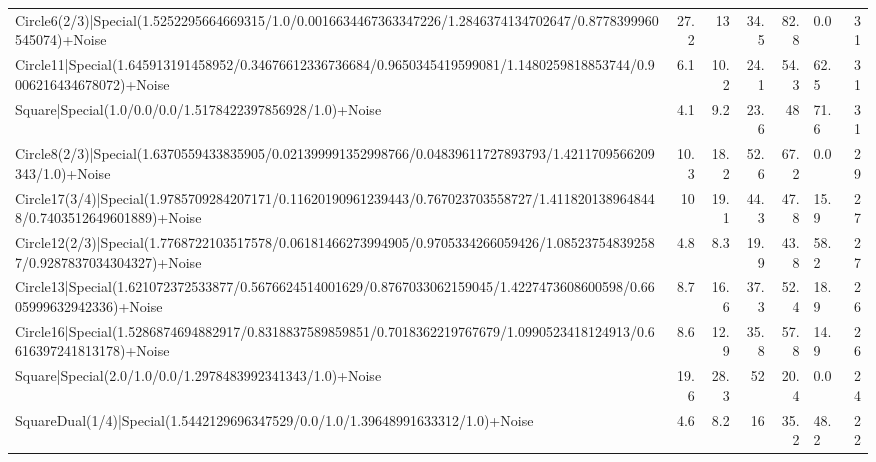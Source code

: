 \begin{tabular}{lrrrrlr}
 Circle6(2/3)|Special(1.5252295664669315/1.0/0.0016634467363347226/1.2846374134702647/0.8778399960545074)+Noise                &            27.2 &           13   &            34.5 &            82.8 & 0.0             &           31 \\
 Circle11|Special(1.645913191458952/0.34676612336736684/0.9650345419599081/1.1480259818853744/0.9006216434678072)+Noise        &             6.1 &           10.2 &            24.1 &            54.3 & 62.5            &           31 \\
 Square|Special(1.0/0.0/0.0/1.5178422397856928/1.0)+Noise                                                                      &             4.1 &            9.2 &            23.6 &            48   & 71.6            &           31 \\
 Circle8(2/3)|Special(1.6370559433835905/0.021399991352998766/0.04839611727893793/1.4211709566209343/1.0)+Noise                &            10.3 &           18.2 &            52.6 &            67.2 & 0.0             &           29 \\
 Circle17(3/4)|Special(1.9785709284207171/0.11620190961239443/0.767023703558727/1.4118201389648448/0.7403512649601889)+Noise   &            10   &           19.1 &            44.3 &            47.8 & 15.9            &           27 \\
 Circle12(2/3)|Special(1.7768722103517578/0.06181466273994905/0.9705334266059426/1.085237548392587/0.9287837034304327)+Noise   &             4.8 &            8.3 &            19.9 &            43.8 & 58.2            &           27 \\
 Circle13|Special(1.621072372533877/0.5676624514001629/0.8767033062159045/1.4227473608600598/0.6605999632942336)+Noise         &             8.7 &           16.6 &            37.3 &            52.4 & 18.9            &           26 \\
 Circle16|Special(1.5286874694882917/0.8318837589859851/0.7018362219767679/1.0990523418124913/0.6616397241813178)+Noise        &             8.6 &           12.9 &            35.8 &            57.8 & 14.9            &           26 \\
 Square|Special(2.0/1.0/0.0/1.2978483992341343/1.0)+Noise                                                                      &            19.6 &           28.3 &            52   &            20.4 & 0.0             &           24 \\
 SquareDual(1/4)|Special(1.5442129696347529/0.0/1.0/1.39648991633312/1.0)+Noise                                                &             4.6 &            8.2 &            16   &            35.2 & 48.2            &           22 \\

\end{tabular}
